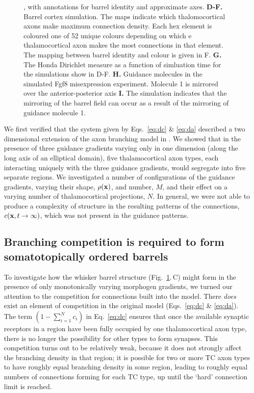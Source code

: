 \documentclass[9pt,twocolumn,twoside,lineno]{pnas-new}
\begin{document}
\begin{figure}
{  \cite{shimogori_fibroblast_2005}, with annotations for barrel identity and
  approximate axes.  \textbf{D-F.} Barrel cortex simulation. The maps indicate
  which thalomocortical axons make maximum connection density. Each hex
  element is coloured one of 52 unique colours depending on which e
  thalamocortical axon makes the most connections in that element. The mapping
  between barrel identity and colour is given in F.  \textbf{G.} The Honda
  Dirichlet measure as a function of simluation time for the simulations show
  in D-F. \textbf{H.}  Guidance molecules in the simulated Fgf8 misexpression
  experiment. Molecule 1 is mirrored over the anterior-posterior axis
  \textbf{I.} The simulation indicates that the mirroring of the barrel field
  can occur as a result of the mirroring of guidance molecule 1.}
\label{fig:main}
\end{figure}


We first verified that the system given by Eqs.~\ref{eq:dc} \& \ref{eq:da}
described a two dimensional extension of the axon branching model in
\cite{karbowski_model_2004}. We showed that in the presence of three guidance
gradients varying only in one dimension (along the long axis of an elliptical
domain), five thalamocortical axon types, each interacting uniquely with the
three guidance gradients, would segregate into five separate regions. We
investigated a number of configurations of the guidance gradients, varying
their shape, $\rho(\mathbf{x})$, and number, $M$, and their effect on a varying
number of thalamocortical projections, $N$. In general, we were not able to
produce a complexity of structure in the resulting patterns of the
connections, $c(\mathbf{x},t\rightarrow\infty)$, which was not present in the
guidance patterns.


\subsection*{Branching competition is required to form somatotopically ordered barrels}

To investigate how the whisker barrel structure (Fig.~\ref{fig:main}.\,C) might
form in the presence of only monotonically varying morphogen gradients, we
turned our attention to the competition for connections built into the
model. There \emph{does} exist an element of competition in the original model
(Eqs.~\ref{eq:dc} \& \ref{eq:da}). The term $\left(1 - \sum_{i=1}^{N}
c_i\right)$ in Eq.~\ref{eq:dc} ensures that once the available synaptic
receptors in a region have been fully occupied by one thalamocortical axon
type, there is no longer the possibility for other types to form
synapses. This competition turns out to be relatively weak, because it does
not strongly affect the branching density in that region; it is possible for
two or more TC axon types to have roughly equal branching density in some
region, leading to roughly equal numbers of connections forming for each TC
type, up until the `hard' connection limit is reached.
\end{document}
